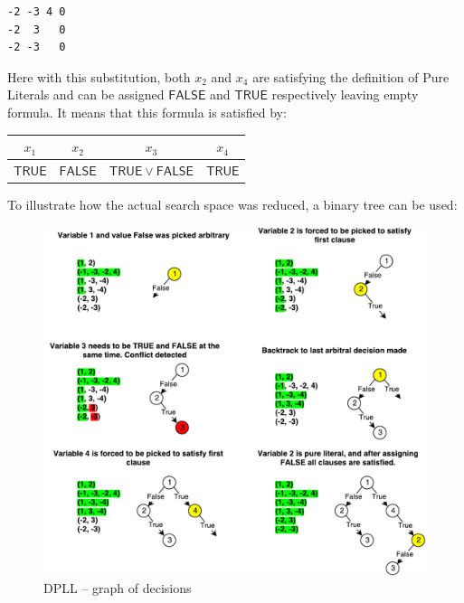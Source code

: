 \documentclass[12pt,english,pdflatex]{aghdpl}
\begin{document}
\begin{lstlisting}
-2 -3 4 0
-2  3   0
-2 -3   0
\end{lstlisting}
Here with this substitution, both $x_2$ and $x_4$ are satisfying the definition of Pure Literals
and can be assigned $\mathsf{FALSE}$ and $\mathsf{TRUE}$ respectively leaving empty formula.
It means that this formula is satisfied by:
\begin{center}
\setlength{\tabcolsep}{6pt}
\begin{tabular}{c|c|c|c}
  $x_1$   &   $x_2$ & $x_3$   &   $x_4$   \\
  \hline
  $\mathsf{TRUE}$  &   $\mathsf{FALSE}$ & $\mathsf{TRUE}\vee \mathsf{FALSE}$\footnotemark  &   $\mathsf{TRUE}$ 
\end{tabular}
\end{center}
To illustrate how the actual search space was reduced, a binary
tree can be used:
\label{fig:DPLL}
\begin{figure}[H]
\begin{centering}
\includegraphics[scale=0.75]{img/dpll_graph}
\par\end{centering}
\caption{DPLL -- graph of decisions}
\end{figure}
\end{document}
